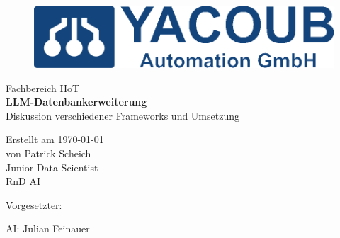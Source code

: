 
%
\begin{titlepage}
    \begin{center}
        \begin{figure}[htbp]
            \centering
            \begin{minipage}{1\textwidth}
                \centering
                \includegraphics[width=0.35\textheight]{Figures/logo.png}
            \end{minipage}
      \end{figure}

        \huge
        Fachbereich IIoT\\
        \vspace{0.25cm} %
        \huge
        \textbf{LLM-Datenbankerweiterung} \\
        \vspace{0.25cm} %
        \Large
        Diskussion verschiedener Frameworks und Umsetzung  \\
        \vspace{0.75cm} %
    \end{center}    
    \vfill %
    Erstellt am \today\\
    von Patrick Scheich\\
    Junior Data Scientist\\
    RnD AI
    \begin{labeling}{Vorgesetzter:}
        \item[AI:]\tabto{1cm} Julian Feinauer
    \end{labeling}
\end{titlepage}
